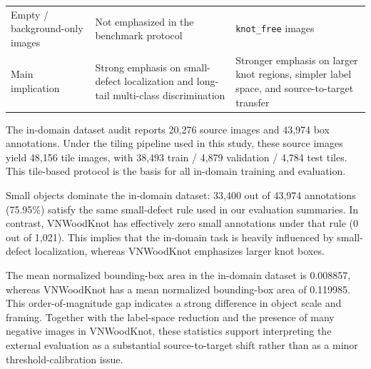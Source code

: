\documentclass[10pt,a4paper]{article}
\begin{document}
\begin{table}[t]
\begin{tabularx}{0.94\textwidth}{>{\raggedright\arraybackslash}p{} >{\raggedright\arraybackslash}X >{\raggedright\arraybackslash}X}
    Empty / background-only images & Not emphasized in the benchmark protocol & 500 \texttt{knot\_free} images \\
    Main implication & Strong emphasis on small-defect localization and long-tail multi-class discrimination & Stronger emphasis on larger knot regions, simpler label space, and source-to-target transfer \\
    \bottomrule
  \end{tabularx}
\end{table}

The in-domain dataset audit reports 20,276 source images and 43,974 box annotations. Under the tiling pipeline used in this study, these source images yield 48,156 tile images, with 38,493 train / 4,879 validation / 4,784 test tiles. This tile-based protocol is the basis for all in-domain training and evaluation.

Small objects dominate the in-domain dataset: 33,400 out of 43,974 annotations (75.95\%) satisfy the same small-defect rule used in our evaluation summaries. In contrast, VNWoodKnot has effectively zero small annotations under that rule (0 out of 1,021). This implies that the in-domain task is heavily influenced by small-defect localization, whereas VNWoodKnot emphasizes larger knot boxes.

The mean normalized bounding-box area in the in-domain dataset is 0.008857, whereas VNWoodKnot has a mean normalized bounding-box area of 0.119985. This order-of-magnitude gap indicates a strong difference in object scale and framing. Together with the label-space reduction and the presence of many negative images in VNWoodKnot, these statistics support interpreting the external evaluation as a substantial source-to-target shift rather than as a minor threshold-calibration issue.
\end{document}
